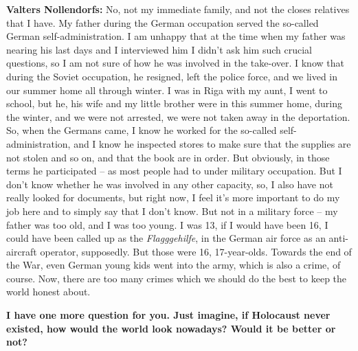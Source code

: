 \textbf{Valters Nollendorfs:} No, not my immediate family, and not the closes relatives that I have. My father during the German occupation served the so-called German self-administration. I am unhappy that at the time when my father was nearing his last days and I interviewed him I didn’t ask him such crucial questions, so I am not sure of how he was involved in the take-over. I know that during the Soviet occupation, he resigned, left the police force, and we lived in our summer home all through winter. I was in Riga with my aunt, I went to school, but he, his wife and my little brother were in this summer home, during the winter, and we were not arrested, we were not taken away in the deportation. So, when the Germans came, I know he worked for the so-called self-administration, and I know he inspected stores to make sure that the supplies are not stolen and so on, and that the book are in order. But obviously, in those terms he participated – as most people had to under military occupation. But I don’t know whether he was involved in any other capacity, so, I also have not really looked for documents, but right now, I feel it’s more important to do my job here and to simply say that I don’t know. But not in a military force – my father was too old, and I was too young. I was 13, if I would have been 16, I could have been called up as the \textit{Flagggehilfe}, in the German air force as an anti-aircraft operator, supposedly. But those were 16, 17-year-olds. Towards the end of the War, even German young kids went into the army, which is also a crime, of course. Now, there are too many crimes which we should do the best to keep the world honest about. 

\textbf{I have one more question for you. Just imagine, if Holocaust never existed, how would the world look nowadays? Would it be better or not?}

